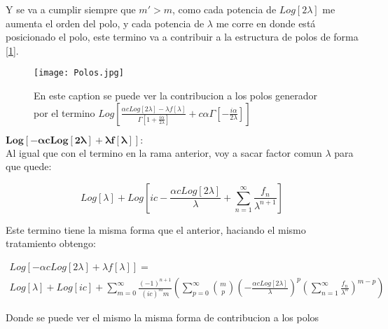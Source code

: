 Y se va a cumplir siempre que $m'> m$, como cada potencia de $Log[2 \lambda]$ me aumenta el orden del polo, y cada potencia de $\lambda$ me corre en donde está posicionado el polo, este termino va a contribuir a la estructura de polos de forma [\ref{fig:Dibujo}]. \\

\begin{figure}
    \centering
    \texttt{[image: Polos.jpg]}
    \caption{En este caption se puede ver la contribucion a los polos generador por el termino $Log[
	\frac{\alpha c Log[2 \lambda] - \lambda f[\lambda] }{\Gamma \left[1 + \frac{i \alpha}{ 2 \lambda} \right] } + 
	c \alpha \Gamma \left[ - \frac{i \alpha}{2 \lambda} \right] ]$ }
    \label{fig:Dibujo}
\end{figure}

$\mathbf{
		Log[- \alpha c Log[2 \lambda] + \lambda f[\lambda] ]
		}: 
		$ \\

Al igual que con el termino en la rama anterior, voy a sacar factor comun $\lambda$ para que quede:

\begin{equation}
Log[\lambda] + 
Log[i c - \frac{\alpha c Log[2 \lambda] }{\lambda} + 
\sum _{n=1} ^{\infty} \frac{f _n}{\lambda ^{n+1}} ]
\end{equation}

Este termino tiene la misma forma que el anterior, haciando el mismo tratamiento obtengo:

\begin{equation}
\begin{array}{c}
Log[- \alpha c Log[2 \lambda] + \lambda f[\lambda] ] = \\
Log[\lambda] + Log[i c] + 
\sum _{m=0} ^{\infty} \frac{(-1)^{n+1}}{(i c) ^m m}
							\left(
								\sum _{p=0} ^{\infty} {m\choose p} 
									\left( - \frac{ \alpha c Log[2 \lambda] } {\lambda} \right) ^p
									\left( \sum _{n=1} ^{\infty} \frac{f _n}{\lambda ^n} \right) ^{m-p} 
								\right)
\end{array}
\end{equation}

Donde se puede ver el mismo la misma forma de contribucion a los polos 



